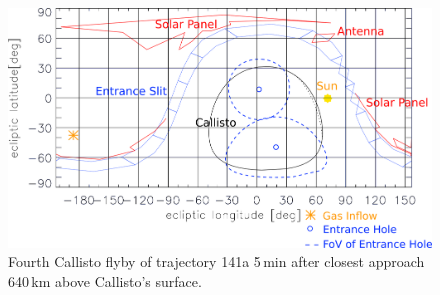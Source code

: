 		\begin{figure}[h!]
			\centering
			\includegraphics[width = .7\textwidth]{Bilder/NIM_pointing_2031JAN15195700.png}
			\caption{Fourth Callisto flyby of trajectory 141a \cite{SOC_Crema3p2} 5\,min after closest approach 640\,km above Callisto's surface.}
			\label{fig:FlybyCal1957}
		\end{figure}
